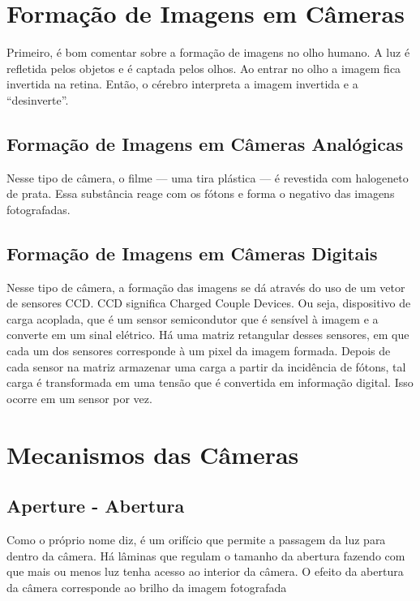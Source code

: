 \documentclass[a4paper, 12pt]{article}
\begin{document}
\section{Formação de Imagens em Câmeras}
Primeiro, é bom comentar sobre a formação de imagens no olho humano. A luz é refletida pelos objetos e é captada pelos olhos. Ao entrar no olho
a imagem fica invertida na retina. Então, o cérebro interpreta a imagem invertida e a ``desinverte''.
\subsection{Formação de Imagens em Câmeras Analógicas}
Nesse tipo de câmera, o filme --- uma tira plástica --- é revestida com halogeneto de prata. Essa substância reage com os fótons e forma
o negativo das imagens fotografadas.
\subsection{Formação de Imagens em Câmeras Digitais}
Nesse tipo de câmera, a formação das imagens se dá através do uso de um vetor de sensores CCD. CCD significa Charged Couple Devices.
Ou seja, dispositivo de carga acoplada, que é um sensor semicondutor que é sensível à imagem e a converte em um sinal elétrico. Há uma matriz
retangular desses sensores, em que cada um dos sensores corresponde à um pixel da imagem formada. Depois de cada sensor na matriz armazenar uma carga
a partir da incidência de fótons, tal carga é transformada em uma tensão que é convertida em informação digital. Isso ocorre em um sensor por vez.

\section{Mecanismos das Câmeras}
\subsection{Aperture - Abertura}
Como o próprio nome diz, é um orifício que permite a passagem da luz para dentro da câmera. Há lâminas que regulam o tamanho da abertura 
fazendo com que mais ou menos luz tenha acesso ao interior da câmera.
O efeito da abertura da câmera corresponde ao brilho da imagem fotografada
\end{document}
